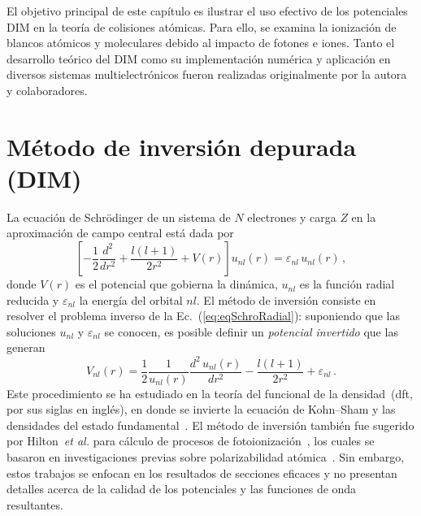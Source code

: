 El objetivo principal de este capítulo es ilustrar el uso efectivo de 
los potenciales DIM en la teoría de colisiones atómicas. Para ello, se 
examina la ionización de blancos atómicos y moleculares debido al 
impacto de fotones e iones. Tanto el desarrollo teórico del DIM como su 
implementación numérica y aplicación en diversos sistemas 
multielectrónicos fueron realizadas originalmente por la autora y 
colaboradores. 

\section{Método de inversión depurada (DIM)}
\label{sec:dimatomos}

La ecuación de Schr\"odinger de un sistema de $N$ electrones y carga $Z$ 
en la aproximación de campo central está dada por
\begin{equation}
 \left[ -\frac{1}{2}\frac{d^2}{dr^2} + \frac{l(l+1)}{2r^2} +
 V(r) \right] u_{nl}(r) = \varepsilon_{nl} \, u_{nl}(r)\,,
\label{eq:eqSchroRadial}
\end{equation}
donde $V(r)$ es el potencial que gobierna la dinámica, $u_{nl}$ es la 
función radial reducida y $\varepsilon_{nl}$ la energía del orbital 
$nl$. 
El método de inversión consiste en resolver el problema inverso de la 
Ec.~(\ref{eq:eqSchroRadial}): suponiendo que las soluciones $u_{nl}$ y 
$\varepsilon_{nl}$ se conocen, es posible definir un \textit{potencial 
invertido} que las generan
\begin{equation}
V_{nl}(r) = 
\frac{1}{2}\frac{1}{u_{nl}(r)} \frac{d^2\,u_{nl}(r)}{dr^{2}} - 
\frac{l(l+1)}{2r^{2}}+\varepsilon_{nl} \,.
\label{eq:Vinv}
\end{equation}
Este procedimiento se ha estudiado en la teoría del funcional de la 
densidad~(\acs{dft}, por sus siglas en inglés), en donde se invierte la
ecuación de Kohn--Sham y las densidades del estado 
fundamental~\cite{Wu:03,Gaiduk:13,Ryabinkin:15,Schipper:97,deSilva:12,
Kananenka:13,Jacob:11}. El método de inversión también fue sugerido por 
Hilton~\textit{et al.} para cálculo de procesos de 
fotoionización~\cite{Hilton:77,Suzer:77,Hilton:79,Hilton:80,Crljen:87}, 
los cuales se basaron en investigaciones previas sobre polarizabilidad 
atómica~\cite{Sternheimer:54,Dalgarno:59}. Sin embargo, estos trabajos 
se enfocan en los resultados de secciones eficaces y no presentan 
detalles acerca de la calidad de los potenciales y las funciones de onda 
resultantes. 

